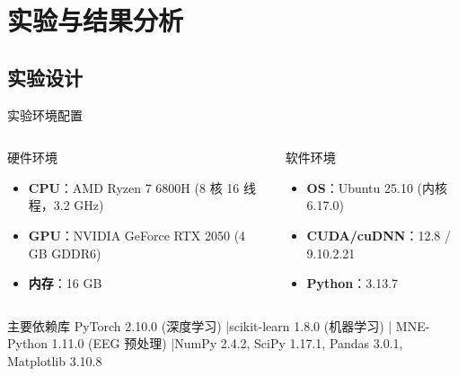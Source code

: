\section{实验与结果分析}

{\small

\subsection{实验设计}

\begin{frame}{实验环境配置}
    \begin{columns}[T]
        \begin{block}{硬件环境}
            \footnotesize
            \begin{itemize}
                \item \textbf{CPU}：AMD Ryzen 7 6800H (8 核 16 线程，3.2 GHz)
                \item \textbf{GPU}：NVIDIA GeForce RTX 2050 (4 GB GDDR6)
                \item \textbf{内存}：16 GB
            \end{itemize}
        \end{block}

        \begin{block}{软件环境}
            \footnotesize
            \begin{itemize}
                \item \textbf{OS}：Ubuntu 25.10 (内核 6.17.0)
                \item \textbf{CUDA/cuDNN}：12.8 / 9.10.2.21
                \item \textbf{Python}：3.13.7
            \end{itemize}
        \end{block}
    \end{columns}

    \begin{block}{主要依赖库}
        \footnotesize
        PyTorch 2.10.0 (深度学习) \quad|\quad scikit-learn 1.8.0 (机器学习) \quad|\quad 
        MNE-Python 1.11.0 (EEG 预处理) \quad|\quad NumPy 2.4.2, SciPy 1.17.1, Pandas 3.0.1, Matplotlib 3.10.8
    \end{block}


\end{frame}}
